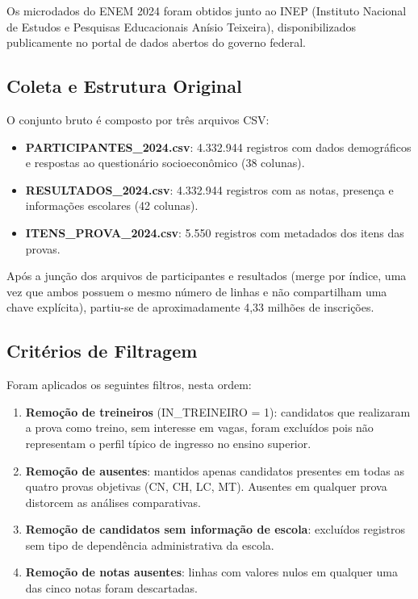 \documentclass[a4paper,12pt]{article}
\begin{document}
Os microdados do ENEM 2024 foram obtidos junto ao INEP (Instituto Nacional de Estudos e Pesquisas Educacionais Anísio Teixeira), disponibilizados publicamente no portal de dados abertos do governo federal.

\subsection{Coleta e Estrutura Original}

O conjunto bruto é composto por três arquivos CSV:

\begin{itemize}
    \item \textbf{PARTICIPANTES\_2024.csv}: 4.332.944 registros com dados demográficos e respostas ao questionário socioeconômico (38 colunas).
    \item \textbf{RESULTADOS\_2024.csv}: 4.332.944 registros com as notas, presença e informações escolares (42 colunas).
    \item \textbf{ITENS\_PROVA\_2024.csv}: 5.550 registros com metadados dos itens das provas.
\end{itemize}

Após a junção dos arquivos de participantes e resultados (merge por índice, uma vez que ambos possuem o mesmo número de linhas e não compartilham uma chave explícita), partiu-se de aproximadamente 4,33 milhões de inscrições.

\subsection{Critérios de Filtragem}

Foram aplicados os seguintes filtros, nesta ordem:

\begin{enumerate}
    \item \textbf{Remoção de treineiros} (IN\_TREINEIRO = 1): candidatos que realizaram a prova como treino, sem interesse em vagas, foram excluídos pois não representam o perfil típico de ingresso no ensino superior.
    \item \textbf{Remoção de ausentes}: mantidos apenas candidatos presentes em todas as quatro provas objetivas (CN, CH, LC, MT). Ausentes em qualquer prova distorcem as análises comparativas.
    \item \textbf{Remoção de candidatos sem informação de escola}: excluídos registros sem tipo de dependência administrativa da escola.
    \item \textbf{Remoção de notas ausentes}: linhas com valores nulos em qualquer uma das cinco notas foram descartadas.
\end{enumerate}
\end{document}
